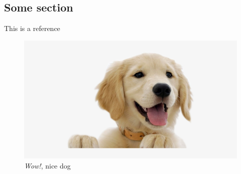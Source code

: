 \documentclass[../main.tex]{subfiles}
\begin{document}
\subsection{Some section}
This is a reference \citep{wallace_immunopathology_2014}
\lipsum[1-1]



\begin{figure}[h]
\includegraphics[width = 1\textwidth]{Figures/Fig1.png}
\centering
\caption{\textit{Wow!}, nice dog}
\end{figure}
\end{document}
